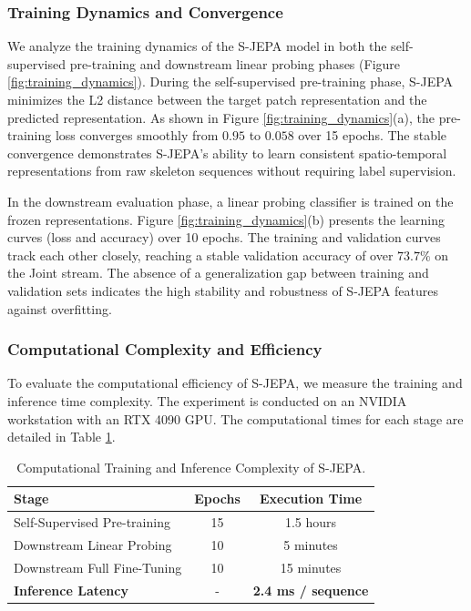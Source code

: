 \documentclass[conference]{IEEEtran}
\begin{document}
\subsubsection{Training Dynamics and Convergence}
We analyze the training dynamics of the S-JEPA model in both the self-supervised pre-training and downstream linear probing phases (Figure \ref{fig:training_dynamics}). During the self-supervised pre-training phase, S-JEPA minimizes the L2 distance between the target patch representation and the predicted representation. As shown in Figure \ref{fig:training_dynamics}(a), the pre-training loss converges smoothly from $0.95$ to $0.058$ over 15 epochs. The stable convergence demonstrates S-JEPA's ability to learn consistent spatio-temporal representations from raw skeleton sequences without requiring label supervision.



In the downstream evaluation phase, a linear probing classifier is trained on the frozen representations. Figure \ref{fig:training_dynamics}(b) presents the learning curves (loss and accuracy) over 10 epochs. The training and validation curves track each other closely, reaching a stable validation accuracy of over $73.7\%$ on the Joint stream. The absence of a generalization gap between training and validation sets indicates the high stability and robustness of S-JEPA features against overfitting.

\subsubsection{Computational Complexity and Efficiency}
To evaluate the computational efficiency of S-JEPA, we measure the training and inference time complexity. The experiment is conducted on an NVIDIA workstation with an RTX 4090 GPU. The computational times for each stage are detailed in Table \ref{tab:comp_time}.

\begin{table}[htbp]
\centering
\caption{Computational Training and Inference Complexity of S-JEPA.}
\label{tab:comp_time}
\begin{tabular}{lcc}
\toprule
\textbf{Stage} & \textbf{Epochs} & \textbf{Execution Time} \\
\midrule
Self-Supervised Pre-training & 15 & 1.5 hours \\
Downstream Linear Probing & 10 & 5 minutes \\
Downstream Full Fine-Tuning & 10 & 15 minutes \\
\midrule
\textbf{Inference Latency} & - & \textbf{2.4 ms / sequence} \\
\bottomrule
\end{tabular}
\end{table}
\end{document}
